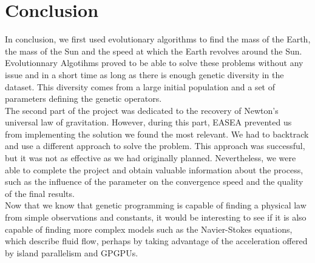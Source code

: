 \section{Conclusion}

In conclusion, we first used evolutionary algorithms to find the mass of the
Earth, the mass of the Sun and the speed at which the Earth revolves around the
Sun. Evolutionnary Algotihms proved to be able to solve these problems without
any issue and in a short time as long as there is enough genetic diversity in
the dataset. This diversity comes from a large initial population and a
set of parameters defining the genetic operators.\\

The second part of the project was dedicated to the recovery of Newton's
universal law of gravitation. However, during this part, EASEA prevented us
from implementing the solution we found the most relevant. We had to
backtrack and use a
different approach to solve the problem. This approach was successful, but it
was not as effective as we had originally planned. Nevertheless, we were able
to complete the project and obtain valuable information about the process, such
as the influence of the parameter on the convergence speed and the quality of
the final results.\\

Now that we know that genetic programming is capable of finding a physical law
from simple observations and constants, it would be interesting to see if it is
also capable of finding more complex models such as the Navier-Stokes equations,
which describe fluid flow, perhaps by taking advantage of the acceleration
offered by island parallelism and GPGPUs.\\